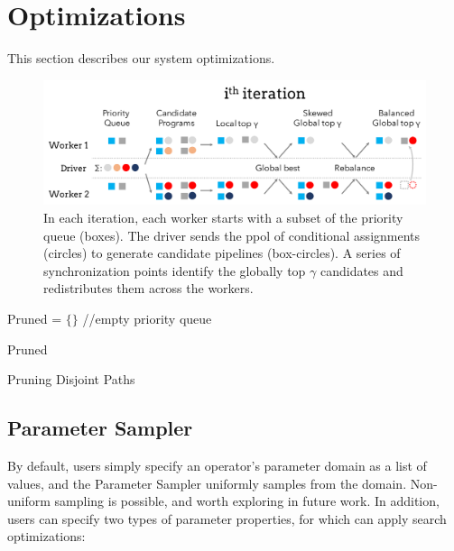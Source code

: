 \section{Optimizations}\label{s:search}
This section describes our system optimizations.

\begin{figure}[t]
    \centering
    \includegraphics[width=\columnwidth]{figures/distributed.pdf}
    \caption{In each iteration, each worker starts with a subset of the priority queue (boxes).  The driver sends the ppol of conditional assignments (circles) to generate candidate pipelines (box-circles).  A series of synchronization points identify the globally top $\gamma$ candidates and redistributes them across the workers.   \label{fig:algo}}
\end{figure}


{
\begin{algorithm}[t]

 Pruned = $\{\}$  //empty priority queue



\Return Pruned
\caption{Pruning Disjoint Paths}
\label{alg:pruning}
\end{algorithm}
}


\subsection{Parameter Sampler}
By default, users simply specify an operator's parameter domain as a list of values, and the Parameter Sampler uniformly samples from the domain. Non-uniform sampling is possible, and worth exploring in future work.   In addition, users can specify two types of parameter properties, for which \sys can apply search optimizations:

